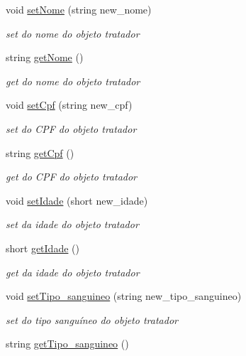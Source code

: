 \begin{DoxyCompactItemize}
void \mbox{\hyperlink{class_tratador_a85649388e0905b1f041dcdd74f90a9cf}{set\+Nome}} (string new\+\_\+nome)
\begin{DoxyCompactList}\small\item\em set do nome do objeto tratador \end{DoxyCompactList}\item 
string \mbox{\hyperlink{class_tratador_a6bdd38bbc9d8805d75d374de88c0c8d5}{get\+Nome}} ()
\begin{DoxyCompactList}\small\item\em get do nome do objeto tratador \end{DoxyCompactList}\item 
void \mbox{\hyperlink{class_tratador_ae55609b3a97e126867f196a5c446c05f}{set\+Cpf}} (string new\+\_\+cpf)
\begin{DoxyCompactList}\small\item\em set do C\+PF do objeto tratador \end{DoxyCompactList}\item 
string \mbox{\hyperlink{class_tratador_a46673ddeb1c34d0fba5c9e45d44438b6}{get\+Cpf}} ()
\begin{DoxyCompactList}\small\item\em get do C\+PF do objeto tratador \end{DoxyCompactList}\item 
void \mbox{\hyperlink{class_tratador_a6a396af90d3a7bab6ecf38c495fc2b4c}{set\+Idade}} (short new\+\_\+idade)
\begin{DoxyCompactList}\small\item\em set da idade do objeto tratador \end{DoxyCompactList}\item 
short \mbox{\hyperlink{class_tratador_a4b1f53b0c58af0896e4a502f84880c1b}{get\+Idade}} ()
\begin{DoxyCompactList}\small\item\em get da idade do objeto tratador \end{DoxyCompactList}\item 
void \mbox{\hyperlink{class_tratador_a1140410a347421770421fe57e95f814a}{set\+Tipo\+\_\+sanguineo}} (string new\+\_\+tipo\+\_\+sanguineo)
\begin{DoxyCompactList}\small\item\em set do tipo sanguíneo do objeto tratador \end{DoxyCompactList}\item 
string \mbox{\hyperlink{class_tratador_acd0df11ea6d1bea241e587c5e9864913}{get\+Tipo\+\_\+sanguineo}} ()

\end{DoxyCompactItemize}
